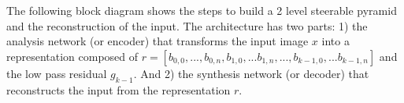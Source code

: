 The following block diagram shows the steps to build a 2 level steerable pyramid and the reconstruction of the input. The architecture has two parts: 1) the analysis network (or encoder) that transforms the input image $x$ into a representation composed of $r=\left[ b_{0,0},...,b_{0,n}, b_{1,0},...b_{1,n},...,b_{k-1,0},...b_{k-1,n} \right]$ and the low pass residual $g_{k-1}$. And 2) the synthesis network (or decoder) that reconstructs the input from the representation $r$.

